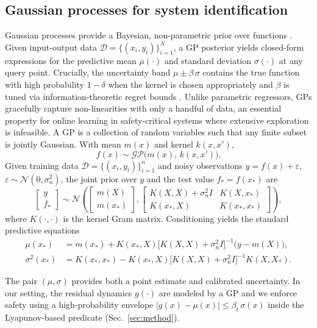 \documentclass[10pt]{article}
\newcommand{\1}{\mathbbm{1}}
\begin{document}
\subsection{Gaussian processes for system identification}
Gaussian processes provide a Bayesian, non-parametric prior over functions \citep{RasmussenWilliams2006GPML}.  Given input-output data $\mathcal D=\{(x_i,y_i)\}_{i=1}^N$, a GP posterior yields closed-form expressions for the predictive mean $\mu(\cdot)$ and standard deviation $\sigma(\cdot)$ at any query point.  Crucially, the uncertainty band $\mu\pm\beta\,\sigma$ contains the true function with high probability $1-\delta$ when the kernel is chosen appropriately and $\beta$ is tuned via information-theoretic regret bounds \citep{Srinivas2010GP-UCB}.  Unlike parametric regressors, GPs gracefully capture non-linearities with only a handful of data, an essential property for online learning in safety-critical systems where extensive exploration is infeasible.
A GP is a collection of random variables such that any finite subset is jointly Gaussian. With mean \(m(x)\) and kernel \(k(x,x')\),
\[
f(x)\sim \mathcal{GP}\!\bigl(m(x),\,k(x,x')\bigr).
\]
Given training data \(\mathcal D=\{(x_i,y_i)\}_{i=1}^n\) and noisy observations \(y=f(x)+\varepsilon\), \(\varepsilon\sim\mathcal N(0,\sigma_n^2)\), the joint prior over \(y\) and the test value \(f_\ast=f(x_\ast)\) are
\[
\begin{bmatrix} y \\ f_\ast \end{bmatrix}
\sim\mathcal N\!\left(
\begin{bmatrix} m(X) \\ m(x_\ast) \end{bmatrix},
\begin{bmatrix}
K(X,X)+\sigma_n^2 I & K(X,x_\ast)\\
K(x_\ast,X) & K(x_\ast,x_\ast)
\end{bmatrix}
\right),
\]
where \(K(\cdot,\cdot)\) is the kernel Gram matrix. Conditioning yields the standard predictive equations
\begin{align}
\mu(x_\ast) &= m(x_\ast) + K(x_\ast,X)\bigl[K(X,X)+\sigma_n^2 I\bigr]^{-1}\!\bigl(y-m(X)\bigr),\label{eq:gp_mean}\\
\sigma^2(x_\ast) &= K(x_\ast,x_\ast) - K(x_\ast,X)\bigl[K(X,X)+\sigma_n^2 I\bigr]^{-1}\!K(X,X_\ast).\label{eq:gp_var}
\end{align}

The pair \((\mu,\sigma)\) provides both a point estimate and calibrated uncertainty. In our setting, the residual dynamics \(g(\cdot)\) are modeled by a GP and we enforce safety using a high-probability envelope \(|g(x)-\mu(x)|\le\beta_t\,\sigma(x)\) inside the Lyapunov-based predicate (Sec.~\ref{sec:method}).
\end{document}
